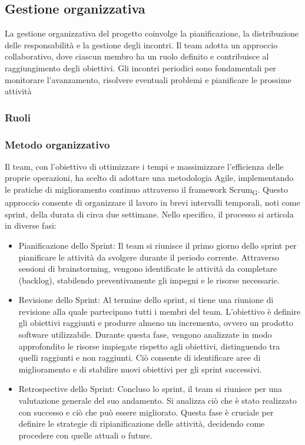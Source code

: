 \documentclass{article}
\begin{document}
\subsection{Gestione organizzativa}
La gestione organizzativa del progetto coinvolge la pianificazione, la distribuzione delle responsabilità e la gestione degli incontri. Il team adotta un approccio collaborativo, dove ciascun membro ha un ruolo definito e contribuisce al raggiungimento degli obiettivi. Gli incontri periodici sono fondamentali per monitorare l'avanzamento, risolvere eventuali problemi e pianificare le prossime attività

\subsubsection{Ruoli}
\subsubsection{Metodo organizzativo}
Il team, con l'obiettivo di ottimizzare i tempi e massimizzare l'efficienza delle proprie operazioni, ha scelto di adottare una metodologia Agile, implementando le pratiche di miglioramento continuo attraverso il framework Scrum\textsubscript{G}. Questo approccio consente di organizzare il lavoro in brevi intervalli temporali, noti come sprint, della durata di circa due settimane. Nello specifico, il processo si articola in diverse fasi:
\begin{itemize}
    \item Pianificazione dello Sprint: Il team si riunisce il primo giorno dello sprint per pianificare le attività da svolgere durante il periodo corrente. Attraverso sessioni di brainstorming, vengono identificate le attività da completare (backlog), stabilendo preventivamente gli impegni e le risorse necessarie.
    \item Revisione dello Sprint: Al termine dello sprint, si tiene una riunione di revisione alla quale partecipano tutti i membri del team. L'obiettivo è definire gli obiettivi raggiunti e produrre almeno un incremento, ovvero un prodotto software utilizzabile. Durante questa fase, vengono analizzate in modo approfondito le risorse impiegate rispetto agli obiettivi, distinguendo tra quelli raggiunti e non raggiunti. Ciò consente di identificare aree di miglioramento e di stabilire nuovi obiettivi per gli sprint successivi.
    \item Retrospective dello Sprint: Concluso lo sprint, il team si riunisce per una valutazione generale del suo andamento. Si analizza ciò che è stato realizzato con successo e ciò che può essere migliorato. Questa fase è cruciale per definire le strategie di ripianificazione delle attività, decidendo come procedere con quelle attuali o future.
\end{itemize}
\end{document}

